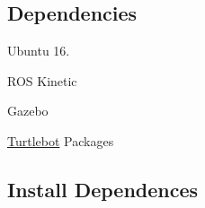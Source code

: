 \subsection*{Dependencies}


\begin{DoxyItemize}
\item Ubuntu 16.
\item R\+OS Kinetic
\item Gazebo
\item \hyperlink{classTurtlebot}{Turtlebot} Packages
\end{DoxyItemize}

\subsection*{Install Dependences}


